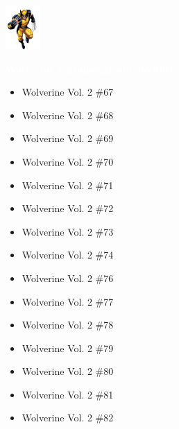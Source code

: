 \documentclass[12pt]{article}
\newcommand{\checkbox}{\raisebox{0.0ex}{\fbox{\rule{0ex}{1.5ex} \rule{1.5ex}{0ex}}}}
\begin{document}
\newpage
{}
\begin{center}
    \vspace*{2cm}
    \includegraphics[width=0.1\textwidth]{wolverine.png}
    \vspace{0.3cm}

    {\Huge \textbf{\textcolor{white}{Wolverine Chronological Checklist}}}
\end{center}
\vspace{0.3cm}
\noindent
\begin{tcolorbox}[
  colback=white!95!gray, colframe=black,
  width=\textwidth, arc=4mm, auto outer arc,
  boxrule=0.8pt,
  left=8pt,right=8pt,top=8pt,bottom=8pt
]
\begin{itemize}[left=0pt,label={\checkbox}]
  \item Wolverine Vol. 2 \#67
  \item Wolverine Vol. 2 \#68
  \item Wolverine Vol. 2 \#69
  \item Wolverine Vol. 2 \#70
  \item Wolverine Vol. 2 \#71
  \item Wolverine Vol. 2 \#72
  \item Wolverine Vol. 2 \#73
  \item Wolverine Vol. 2 \#74
  \item Wolverine Vol. 2 \#76
  \item Wolverine Vol. 2 \#77
  \item Wolverine Vol. 2 \#78
  \item Wolverine Vol. 2 \#79
  \item Wolverine Vol. 2 \#80
  \item Wolverine Vol. 2 \#81
  \item Wolverine Vol. 2 \#82
\end{itemize}
\end{tcolorbox}
\end{document}
